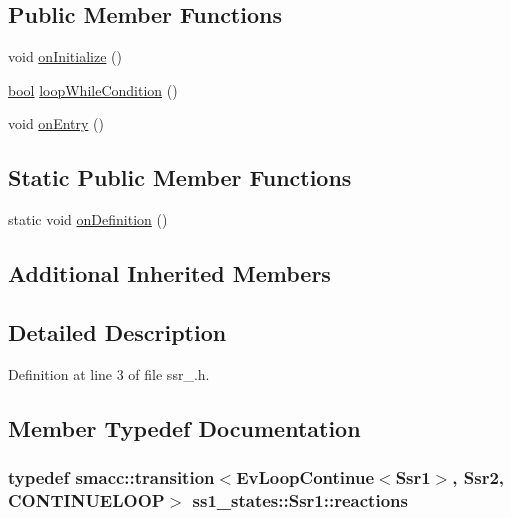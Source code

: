 \subsection*{Public Member Functions}
\begin{DoxyCompactItemize}
\item 
void \hyperlink{structss1__states_1_1Ssr1_ada2ea0a482c4c888ac77e06de6f206f9}{on\+Initialize} ()
\item 
\hyperlink{classbool}{bool} \hyperlink{structss1__states_1_1Ssr1_a324e0690870f121ee6c7f3a273da5f86}{loop\+While\+Condition} ()
\item 
void \hyperlink{structss1__states_1_1Ssr1_ab3600bebe226f26523a7e79d843efb6d}{on\+Entry} ()
\end{DoxyCompactItemize}
\subsection*{Static Public Member Functions}
\begin{DoxyCompactItemize}
\item 
static void \hyperlink{structss1__states_1_1Ssr1_aa71baec614330bb0c497c7ba1b4966fa}{on\+Definition} ()
\end{DoxyCompactItemize}
\subsection*{Additional Inherited Members}


\subsection{Detailed Description}


Definition at line 3 of file ssr\+\_.\+h.



\subsection{Member Typedef Documentation}
\subsubsection[{\texorpdfstring{reactions}{reactions}}]{\setlength{\rightskip}{0pt plus 5cm}typedef {\bf smacc\+::transition}$<$Ev\+Loop\+Continue$<${\bf Ssr1}$>$, {\bf Ssr2}, C\+O\+N\+T\+I\+N\+U\+E\+L\+O\+OP$>$ {\bf ss1\+\_\+states\+::\+Ssr1\+::reactions}}\hypertarget{structss1__states_1_1Ssr1_ad19749148fafde686b74c4fc7c40d7f8}{}\label{structss1__states_1_1Ssr1_ad19749148fafde686b74c4fc7c40d7f8}


